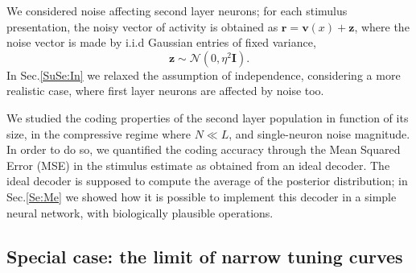 \documentclass[a4paper]{article}
\begin{document}
We considered noise affecting second layer neurons; for each stimulus presentation, the noisy vector of activity is obtained as $\mathbf{r} = \mathbf{v}(x) + \mathbf{z}$, where the noise vector is made by i.i.d Gaussian entries of fixed variance,
\begin{equation}
\mathbf{z} \sim \mathcal{N}(0,\eta^2\textbf{I}).
\end{equation} 
In  Sec.\ref{SuSe:In} we relaxed the assumption of independence, considering a more realistic case, where first layer neurons are affected by noise too. 

We studied the coding properties of the second layer population in function of its size, in the compressive regime where $N \ll L$, and single-neuron noise magnitude.
In order to do so, we quantified the coding accuracy through the Mean Squared Error (MSE) in the stimulus estimate as obtained from an ideal decoder.  The ideal decoder is supposed to compute the average of the posterior distribution; in Sec.\ref{Se:Me} we showed how it is possible to implement this decoder in a simple neural network, with biologically plausible operations. 

\subsection{Special case: the limit of narrow tuning curves}
\end{document}

